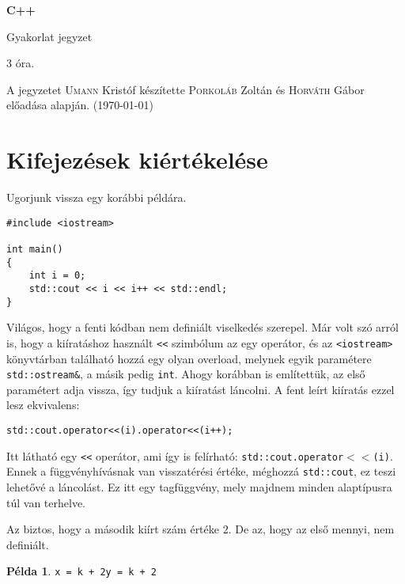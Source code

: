 \documentclass[a4paper,11.5pt,table]{article}
\begin{document}
	\setlength\parindent{0pt}
	\def\<{<\hspace{0mm}<}
	
	\theoremstyle{definition}
	\newtheorem{note}{Megjegyzés}[subsection]
  \newtheorem{example}{Példa}[subsection]
  \newtheorem{definition}{Definíció}[subsection]

	
	\begin{center}
		{\LARGE\textbf{C++}}
		
		{\Large Gyakorlat jegyzet}
		
		3 óra.
	\end{center}
	A jegyzetet \textsc{Umann} Kristóf készítette \textsc{Porkoláb} Zoltán és \textsc{Horváth} Gábor előadása alapján. (\today)
	\section{Kifejezések kiértékelése}
	Ugorjunk vissza egy korábbi példára.
	\begin{lstlisting}
#include <iostream>

int main()
{
	int i = 0;
	std::cout << i << i++ << std::endl;
}
	\end{lstlisting}
	
	Világos, hogy a fenti kódban nem definiált viselkedés szerepel. Már volt szó arról is, hogy a kiíratáshoz használt \texttt{\<} szimbólum az egy operátor, és az \texttt{<iostream>} könyvtárban található hozzá egy olyan overload, melynek egyik paramétere \texttt{std::ostream\&}, a másik pedig \texttt{int}. Ahogy korábban is említettük, az első paramétert adja vissza, így tudjuk a kiíratást láncolni. A fent leírt kiíratás ezzel lesz ekvivalens:
	\begin{lstlisting}
std::cout.operator<<(i).operator<<(i++);
	\end{lstlisting}
	
	Itt látható egy \texttt{\<} operátor, ami így is felírható: \texttt{std::cout.operator$<<$(i)}. Ennek a függvényhívásnak van visszatérési értéke, méghozzá \texttt{std::cout}, ez teszi lehetővé a láncolást. Ez itt egy tagfüggvény, mely majdnem minden alaptípusra túl van terhelve. 
	
	Az biztos, hogy a második kiírt szám értéke 2. De az, hogy az első mennyi, nem definiált.
	
	\begin{example}
		\texttt{x = k + 2}\quad \quad \texttt{y = k + 2}
	\end{example}
	
\end{document}
